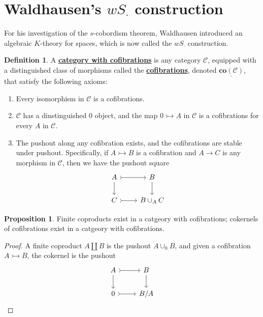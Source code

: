 \documentclass{article}
\theoremstyle{definition}
\theoremstyle{definition}
\newtheorem{definition}{Definition}[theorem]
\theoremstyle{definition}
\theoremstyle{definition}
\newtheorem{proposition}{Proposition}[theorem]
\theoremstyle{definition}
\theoremstyle{definition}
\theoremstyle{definition}
\begin{document}
\section{Waldhausen's $wS_{\cdot}$ construction}
For his investigation of the $s$-cobordism theorem, Waldhausen introduced an algebraic $K$-theory for spaces, which is now called the $wS_{\cdot}$ construction. 





\begin{tcolorbox}[colback=purple!5!white,colframe=purple!75!black]
\begin{definition}
A \underline{\textbf{category with cofibrations}} is any category $\mathcal{C}$, equipped with a distinguished class of morphisms called the \underline{\textbf{cofibrations}}, denoted $\underline{\textbf{co}(\mathcal{C})}$, that satisfy the following axioms:
\begin{enumerate}
    \item Every isomorphism in $\mathcal{C}$ is a cofibrations.
    \item $\mathcal{C}$ has a dinstinguished $0$ object, and the map $0\rightarrowtail A$ in $\mathcal{C}$ is a cofibrations for every $A$ in $\mathcal{C}$. 
    \item  The pushout along any cofibration exists, and the cofibrations are stable under pushout. Specifically, if $A\rightarrowtail B$ is a cofibration and $A\to C$ is any morphism in $\mathcal{C}$, then we have the pushout square 
    \[\begin{tikzcd}
        A & B \\
        C & {B\cup_AC}
        \arrow[tail, from=1-1, to=1-2]
        \arrow[from=1-1, to=2-1]
        \arrow[from=1-2, to=2-2]
        \arrow[tail, from=2-1, to=2-2]
    \end{tikzcd}\]
\end{enumerate}
\end{definition}
\end{tcolorbox}


\begin{tcolorbox}[colback=blue!5!white,colframe=blue!30!white]
\begin{proposition}
Finite coproducts exist in a catgeory with cofibrations; cokernels of cofibrations exist in a catgeory with cofibrations.
\end{proposition}
\end{tcolorbox}
\begin{proof}
    A finite coproduct $A\coprod B$ is the pushout $A\cup_0B$, and given a cofibration $A\rightarrowtail B$, the cokernel is the pushout
    \[\begin{tikzcd}
        A & B \\
        0 & {B/A}
        \arrow[tail, from=1-1, to=1-2]
        \arrow[from=1-1, to=2-1]
        \arrow[from=1-2, to=2-2]
        \arrow[tail, from=2-1, to=2-2]
    \end{tikzcd}\]
\end{proof}
\end{document}
